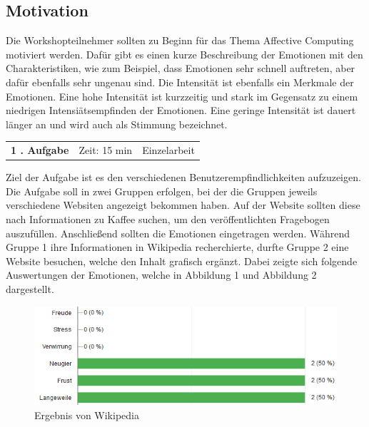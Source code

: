 \subsection{Motivation}


Die Workshopteilnehmer sollten zu Beginn für das Thema Affective Computing motiviert werden. Dafür gibt es einen kurze Beschreibung der Emotionen mit den Charakteristiken, wie zum Beispiel, dass Emotionen sehr schnell auftreten, aber dafür ebenfalls sehr ungenau sind\cite{emotioneninfo}. Die Intensität ist ebenfalls ein Merkmale der Emotionen. Eine hohe Intensität ist kurzzeitig und stark im Gegensatz zu einem niedrigen Intensiätsempfinden der Emotionen. Eine geringe Intensität ist dauert länger an und wird auch als Stimmung bezeichnet. 

\vspace{3mm}


	
	\begin{tabular}{c c c }
		\textbf{1 . Aufgabe} &  Zeit: 15 min & Einzelarbeit\\
	\end{tabular}

\vspace{1mm}


Ziel der Aufgabe ist es den verschiedenen Benutzerempfindlichkeiten aufzuzeigen. Die Aufgabe soll in zwei Gruppen erfolgen, bei der die Gruppen jeweils verschiedene Websiten angezeigt bekommen haben. Auf der Website sollten diese nach Informationen zu Kaffee suchen, um den veröffentlichten Fragebogen auszufüllen. Anschließend sollten die Emotionen eingetragen werden. Während Gruppe 1 ihre Informationen in Wikipedia recherchierte\cite{kaffeewiki}, durfte Gruppe 2 eine Website besuchen, welche den Inhalt grafisch ergänzt\cite{kaffecss}. Dabei zeigte sich folgende Auswertungen der Emotionen, welche in Abbildung 1 und Abbildung 2 dargestellt.


\begin{figure}[!h]
	\centering
	\includegraphics[width=0.9\linewidth]{Pictures/wiki_kaffee}
	\caption[Ergebnis der grafischen Website]{Ergebnis von Wikipedia}
	\label{fig:ergebnis_1}
\end{figure}

